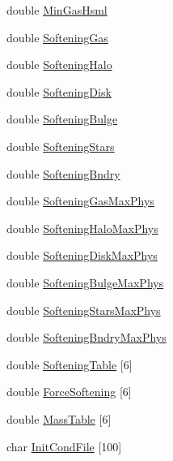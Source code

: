 \begin{DoxyCompactItemize}
double \hyperlink{structglobal__data__all__processes_aec92c94dd2a1d0f0e1ad56f2e790384a}{MinGasHsml}
\item 
double \hyperlink{structglobal__data__all__processes_a1f85943960c69ff351b48fc2f3933ec2}{SofteningGas}
\item 
double \hyperlink{structglobal__data__all__processes_a892cb7014ecd4b3910c493755b875b7e}{SofteningHalo}
\item 
double \hyperlink{structglobal__data__all__processes_a4a4453f9f76bb91ff3418d864caf3222}{SofteningDisk}
\item 
double \hyperlink{structglobal__data__all__processes_a1a0c9ca2f3dfdb2371785b66ced141d7}{SofteningBulge}
\item 
double \hyperlink{structglobal__data__all__processes_a5502dc85fd165d33e9ba8d0f8c01867c}{SofteningStars}
\item 
double \hyperlink{structglobal__data__all__processes_a8c31c4a347bca34b4e8d2292f710596d}{SofteningBndry}
\item 
double \hyperlink{structglobal__data__all__processes_a1e7634a0c6aa4affa124e095bf32285b}{SofteningGasMaxPhys}
\item 
double \hyperlink{structglobal__data__all__processes_a1d4f323715e8df4ea4be9296348cca25}{SofteningHaloMaxPhys}
\item 
double \hyperlink{structglobal__data__all__processes_a575a685feed5223ffc7c5b42b2b369b9}{SofteningDiskMaxPhys}
\item 
double \hyperlink{structglobal__data__all__processes_a215c28ea2e54629e8537bd9868401fa7}{SofteningBulgeMaxPhys}
\item 
double \hyperlink{structglobal__data__all__processes_a7ace4652c6c05275e4fa28dfe6fb374e}{SofteningStarsMaxPhys}
\item 
double \hyperlink{structglobal__data__all__processes_af989ac3052ad7e6bf7d7bfc824274715}{SofteningBndryMaxPhys}
\item 
double \hyperlink{structglobal__data__all__processes_a5d557dca41d454bbc34153a0df2a4338}{SofteningTable} \mbox{[}6\mbox{]}
\item 
double \hyperlink{structglobal__data__all__processes_a2f875884085b35ff64047e46f5348be4}{ForceSoftening} \mbox{[}6\mbox{]}
\item 
double \hyperlink{structglobal__data__all__processes_a0d1dbe97a03958559781d9619f8b17c1}{MassTable} \mbox{[}6\mbox{]}
\item 
char \hyperlink{structglobal__data__all__processes_adacd2b54a924bb4ce144afc1abbc6138}{InitCondFile} \mbox{[}100\mbox{]}

\end{DoxyCompactItemize}
